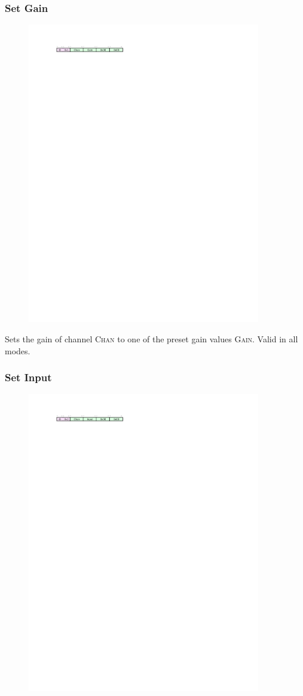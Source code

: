 \subsubsection{Set Gain}
\begin{figure}[h!]
\includegraphics[width=4in]{setgain.cmd.svg}
\end{figure}

Sets the gain of channel \textsc{Chan} to one of the preset gain values \textsc{Gain}. Valid in all modes. 

\subsubsection{Set Input}
\begin{figure}[h!]
\includegraphics[width=4in]{setinput.cmd.svg}
\end{figure}

